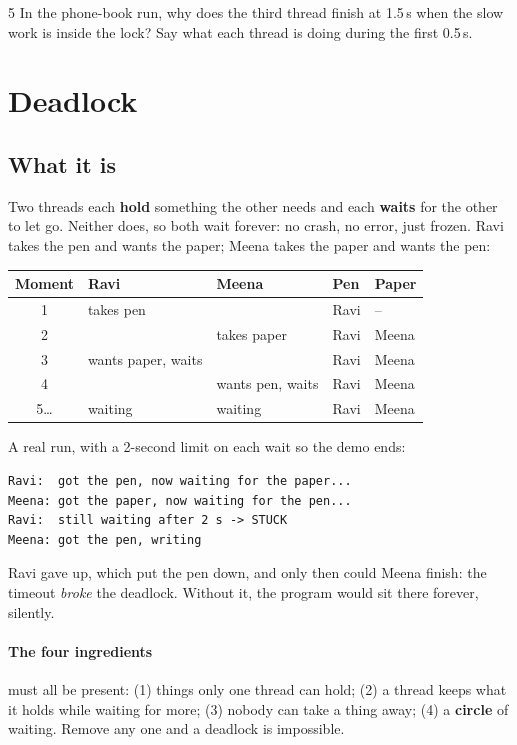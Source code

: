 \documentclass[11pt,a4paper]{article}
\begin{document}
\begin{quickcheck}{5}
In the phone-book run, why does the third thread finish at 1.5\,s when the slow work is inside the
lock? Say what each thread is doing during the first 0.5\,s.
\end{quickcheck}

\section{Deadlock}\label{sec:deadlock}
\subsection{What it is}
Two threads each \textbf{hold} something the other needs and each \textbf{waits} for the other to
let go. Neither does, so both wait forever: no crash, no error, just frozen. Ravi takes the pen and
wants the paper; Meena takes the paper and wants the pen:
\begin{center}
\begin{tabularx}{\textwidth}{c X X l l}
\toprule
\textbf{Moment} & \textbf{Ravi} & \textbf{Meena} & \textbf{Pen} & \textbf{Paper} \\
\midrule
1 & takes pen & & Ravi & -- \\
2 & & takes paper & Ravi & Meena \\
3 & wants paper, waits & & Ravi & Meena \\
4 & & wants pen, waits & Ravi & Meena \\
5\ldots & waiting & waiting & Ravi & Meena \\
\bottomrule
\end{tabularx}
\end{center}
\noindent A real run, with a 2-second limit on each wait so the demo ends:
\begin{lstlisting}
Ravi:  got the pen, now waiting for the paper...
Meena: got the paper, now waiting for the pen...
Ravi:  still waiting after 2 s -> STUCK
Meena: got the pen, writing
\end{lstlisting}
\noindent Ravi gave up, which put the pen down, and only then could Meena finish: the timeout
\emph{broke} the deadlock. Without it, the program would sit there forever, silently.

\paragraph{The four ingredients} must all be present: (1) things only one thread can hold;
(2) a thread keeps what it holds while waiting for more; (3) nobody can take a thing away;
(4) a \textbf{circle} of waiting. Remove any one and a deadlock is impossible.
\end{document}
